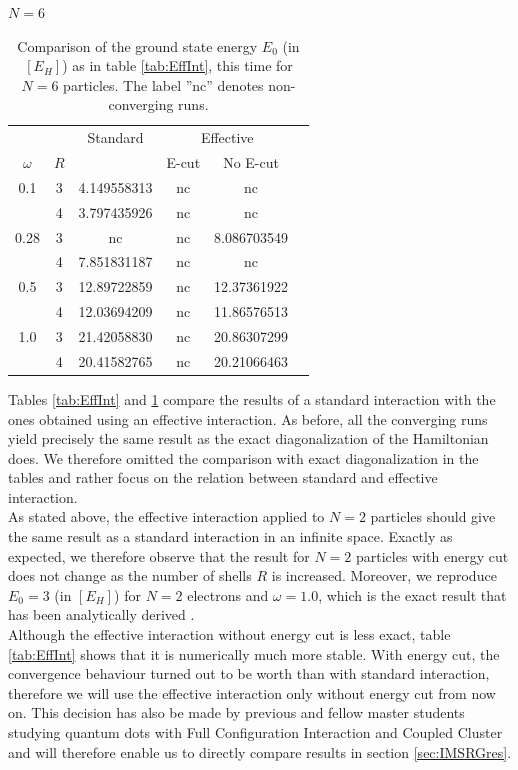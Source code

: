 \begin{table}
\begin{center}
$N = 6$ \\
\vspace{3pt}
\begin{tabular}{c|c|cccc}
\hline\hline
 & &Standard  &\multicolumn{2}{c}{Effective}\\
$\omega$ &$R$ & & E-cut& No E-cut \\
 \hline
   0.1    & 3 & 4.149558313  &nc   & nc \\
          & 4 & 3.797435926  &  nc & nc  \\ 
 \hline      
   0.28   & 3 &   nc   & nc &   8.086703549 \\
          & 4 &  7.851831187  &nc  & nc   \\
 \hline  
   0.5   & 3 &   12.89722859  & nc & 12.37361922       \\
         & 4 &  12.03694209  & nc &  11.86576513   \\
 \hline   
   1.0    & 3 & 21.42058830   &nc & 20.86307299      \\  
          & 4 & 20.41582765   & nc  &  20.21066463   \\
\hline\hline
\end{tabular}
\end{center}
\caption{Comparison of the ground state energy $E_0$ (in $\left[ E_H\right]$) as in table \ref{tab:EffInt}, this time for $N=6$ particles. The label ''nc'' denotes non-converging runs.}
\label{tab:EffInt2}
\end{table}

Tables \ref{tab:EffInt} and \ref{tab:EffInt2} compare the results of a standard interaction with the ones obtained using an effective interaction. As before, all the converging runs yield precisely the same result as the exact diagonalization of the Hamiltonian does. We therefore omitted the comparison with exact diagonalization in the tables and rather focus on the relation between standard and effective interaction.\\
As stated above, the effective interaction applied to $N=2$ particles should give the same result as a standard interaction in an infinite space. Exactly as expected, we therefore observe that the result for $N=2$ particles with energy cut does not change as the number of shells $R$ is increased. Moreover, we reproduce $E_0 = 3$ (in $\left[ E_H \right]$) for $N=2$ electrons and $\omega = 1.0$, which is the exact result that has been analytically derived \cite{PhysRevA.48.3561}. \\
Although the effective interaction without energy cut is less exact, table \ref{tab:EffInt} shows that it is numerically much more stable.  With energy cut, the convergence behaviour turned out to be worth
than with standard interaction, therefore we will use the effective interaction only without energy cut from now on. This decision has also be made by previous and fellow master students studying quantum dots with Full Configuration Interaction \cite{Frank} and Coupled Cluster \cite{Christoffer} and will therefore enable us to directly compare results in section \ref{sec:IMSRGres}.

